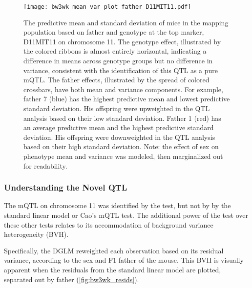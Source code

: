     \begin{figure}
        \centering
        \texttt{[image: bw3wk\_mean\_var\_plot\_father\_D11MIT11.pdf]}
        \caption[
          The predictive mean and standard deviation of mice in the mapping population based on father and genotype at the top marker, D11MIT11 on chromosome 11.
        ]
        {
          The predictive mean and standard deviation of mice in the mapping population based on father and genotype at the top marker, D11MIT11 on chromosome 11.
          The genotype effect, illustrated by the colored ribbons is almost entirely horizontal, indicating a difference in means across genotype groups but no difference in variance, consistent with the identification of this QTL as a pure mQTL.
          The father effects, illustrated by the spread of colored crossbars, have both mean and variance components.
          For example, father 7 (blue) has the highest predictive mean and lowest predictive standard deviation.
          His offspring were upweighted in the QTL analysis based on their low standard deviation.
          Father 1 (red) has an average predictive mean and the highest predictive standard deviation.
          His offspring were downweighted in the QTL analysis based on their high standard deviation.
          Note: the effect of sex on phenotype mean and variance was modeled, then marginalized out for readability.
        }
        \label{fig:bw3wk_meanvar}
    \end{figure}

    \subsubsection{Understanding the Novel QTL}

    The mQTL on chromosome 11 was identified by the \DGLMm test, but not by by the standard linear model or Cao's mQTL test.
    The additional power of the \DGLMm test over these other tests relates to its accommodation of background variance heterogeneity (BVH).
    
    Specifically, the DGLM reweighted each observation based on its residual variance, according to the sex and F1 father of the mouse.
    This BVH is visually apparent when the residuals from the standard linear model are plotted, separated out by father (\autoref{fig:bw3wk_resids}).


